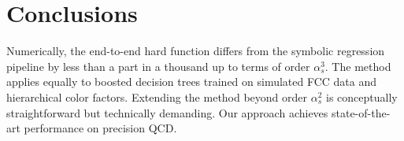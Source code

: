 \section{Conclusions}\label{sec:conclusions}

Numerically, the end-to-end hard function differs from the symbolic
regression pipeline by less than a part in a thousand up to terms of
order $\alpha_s^3$. The method applies equally to boosted decision trees
trained on simulated FCC data and hierarchical color factors. Extending
the method beyond order $\alpha_s^2$ is conceptually straightforward but
technically demanding. Our approach achieves state-of-the-art
performance on precision QCD.


